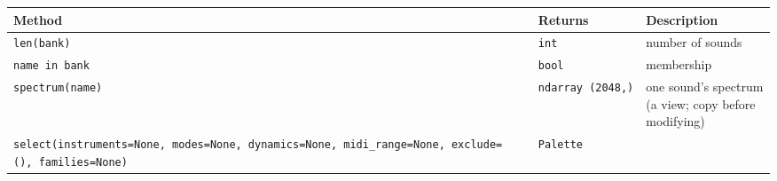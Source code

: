 \documentclass[
  10pt,
]{article}
\begin{document}
\begin{longtable}[]{@{}lll@{}}
\toprule
\begin{minipage}[b]{0.30\columnwidth}\raggedright
Method\strut
\end{minipage} &
\begin{minipage}[b]{0.30\columnwidth}\raggedright
Returns\strut
\end{minipage} &
\begin{minipage}[b]{0.30\columnwidth}\raggedright
Description\strut
\end{minipage}\tabularnewline
\midrule
\endhead
\begin{minipage}[t]{0.30\columnwidth}\raggedright
\texttt{len(bank)}\strut
\end{minipage} &
\begin{minipage}[t]{0.30\columnwidth}\raggedright
\texttt{int}\strut
\end{minipage} &
\begin{minipage}[t]{0.30\columnwidth}\raggedright
number of sounds\strut
\end{minipage}\tabularnewline
\begin{minipage}[t]{0.30\columnwidth}\raggedright
\texttt{name\ in\ bank}\strut
\end{minipage} &
\begin{minipage}[t]{0.30\columnwidth}\raggedright
\texttt{bool}\strut
\end{minipage} &
\begin{minipage}[t]{0.30\columnwidth}\raggedright
membership\strut
\end{minipage}\tabularnewline
\begin{minipage}[t]{0.30\columnwidth}\raggedright
\texttt{spectrum(name)}\strut
\end{minipage} &
\begin{minipage}[t]{0.30\columnwidth}\raggedright
\texttt{ndarray\ (2048,)}\strut
\end{minipage} &
\begin{minipage}[t]{0.30\columnwidth}\raggedright
one sound's spectrum (a view; copy before modifying)\strut
\end{minipage}\tabularnewline
\begin{minipage}[t]{0.30\columnwidth}\raggedright
\texttt{select(instruments=None,\ modes=None,\ dynamics=None,\ midi\_range=None,\ exclude=(),\ families=None)}\strut
\end{minipage} &
\begin{minipage}[t]{0.30\columnwidth}\raggedright
\texttt{Palette}\strut
\end{minipage} &

\end{longtable}
\end{document}

